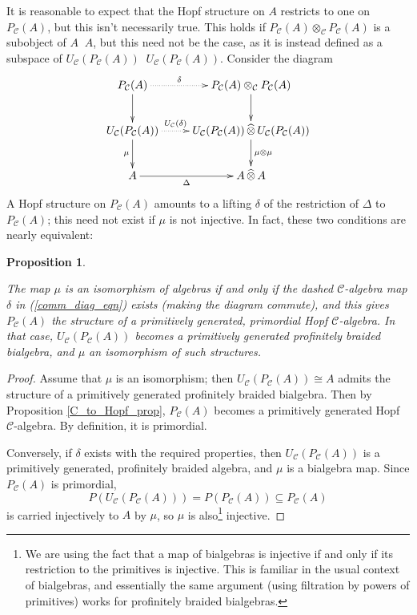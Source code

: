 \documentclass[12pt]{article}
\DeclareMathOperator{\hattimes}{\widehat{\otimes}}
\newcommand{\CC} {\mathcal{C}}
\newcommand{\beqn}{\begin{equation}}
\newcommand{\eeqn}{\end{equation}}
\theoremstyle{plain}
\newtheorem{prop}[thm]{Proposition}
\theoremstyle{definition}
\theoremstyle{remark}
\begin{document}
It is reasonable to expect that the Hopf structure on $A$ restricts to one on $P_{\CC}(A)$, but this isn't necessarily true.  This holds if $P_{\CC}(A) \otimes_{\CC} P_{\CC}(A)$ is a subobject of $A \hattimes A$, but this need not be the case, as it is instead defined as a subspace of $U_{\CC}(P_{\CC}(A)) \hattimes U_{\CC}(P_{\CC}(A))$. Consider the diagram 
%
\beqn \label{comm_diag_eqn} \xymatrix{
P_{\CC}(A) \ar[d] \ar@.[r]^-{\delta} & P_{\CC}(A) \otimes_{\CC} P_{\CC}(A) \ar[d] \\
U_{\CC}(P_{\CC}(A)) \ar[d]_-{\mu} \ar@.[r]^-{U_{\CC}(\delta)} & U_{\CC}(P_{\CC}(A)) \hattimes U_{\CC}(P_{\CC}(A)) \ar[d]^-{\mu \otimes \mu} \\ 
A \ar[r]_-{\Delta} & A \hattimes A
}\eeqn
%
A Hopf structure on $P_{\CC}(A)$ amounts to a lifting $\delta$ of the restriction of $\Delta$ to $P_{\CC}(A)$; this need not exist if $\mu$ is not injective.  In fact, these two conditions are nearly equivalent:


\begin{prop} \label{mm_simple_prop}

The map $\mu$ is an isomorphism of algebras if and only if the dashed $\CC$-algebra map $\delta$ in (\ref{comm_diag_eqn}) exists (making the diagram commute), and this gives $P_{\CC}(A)$ the structure of a primitively generated, primordial Hopf $\CC$-algebra.  In that case, $U_{\CC}(P_{\CC}(A))$ becomes a primitively generated profinitely braided bialgebra, and $\mu$ an isomorphism of such structures.

\end{prop}

\begin{proof}

Assume that $\mu$ is an isomorphism; then $U_{\CC}(P_{\CC}(A)) \cong A$ admits the structure of a primitively generated profinitely braided bialgebra.  Then by Proposition \ref{C_to_Hopf_prop}, $P_{\CC}(A)$ becomes a primitively generated Hopf $\CC$-algebra.  By definition, it is primordial.

Conversely, if $\delta$ exists with the required properties, then $U_{\CC}(P_{\CC}(A))$ is a primitively generated, profinitely braided algebra, and $\mu$ is a bialgebra map.  Since $P_{\CC}(A)$ is primordial, 
%
$$P(U_{\CC}(P_{\CC}(A))) = P(P_{\CC}(A)) \subseteq P_{\CC}(A)$$
%
is carried injectively to $A$ by $\mu$, so $\mu$ is also\footnote{We are using the fact that a map of bialgebras is injective if and only if its restriction to the primitives is injective.  This is familiar in the usual context of bialgebras, and essentially the same argument (using filtration by powers of primitives) works for profinitely braided bialgebras.} injective.

\end{proof}
\end{document}
